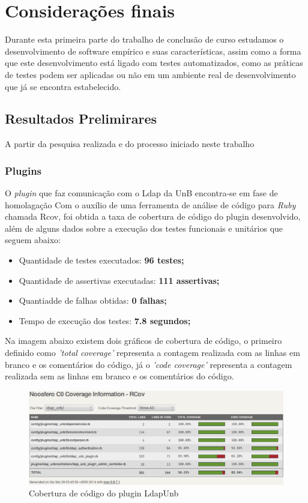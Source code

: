 \chapter{Considerações finais}
\label{consideracoes-finais}

Durante esta primeira parte do trabalho de conclusão de curso estudamos o desenvolvimento de software empírico e suas características, assim como a forma que este desenvolvimento está ligado com testes automatizados, como as práticas de testes podem ser aplicadas ou não em um ambiente real de desenvolvimento
que já se encontra estabelecido.

\section{Resultados Prelimirares}
\label{results}

A partir da pesquisa realizada e do processo iniciado neste trabalho
\subsection{Plugins}

O \textit{plugin} que faz comunicação com o Ldap da UnB encontra-se em fase de homolagação
Com o auxílio de uma ferramenta de análise de código para \textit{Ruby} chamada Rcov, foi obtida a taxa de cobertura de código do plugin desenvolvido, além de alguns dados sobre a execução dos testes funcionais e unitários que seguem abaixo:

\begin{itemize}
\item Quantidade de testes executados: \textbf{96 testes;}
\item Quantidade de assertivas executadas: \textbf{111 assertivas;}
\item Quantiadde de falhas obtidas: \textbf{0 falhas;}
\item Tempo de execução dos testes: \textbf{7.8 segundos;}
\end{itemize}

Na imagem abaixo existem dois gráficos de cobertura de código, o primeiro definido como \textit{'total coverage'} representa a contagem realizada com as linhas em branco e os comentários do código, já o \textit{'code coverage'} representa a contagem realizada sem as linhas em branco e os comentários do código.

%
\begin{figure}[!h]
    \centering
    \includegraphics[keepaspectratio=false,scale=0.45]
      {figuras/cobertura_teste.eps}
    \caption{Cobertura de código do plugin LdapUnb}
    \label{consideracoes_cobertura1}
\end{figure}
%


